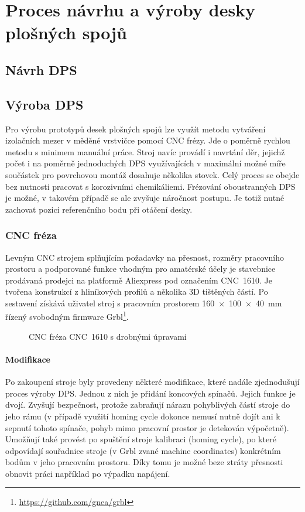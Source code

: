 \section{Proces návrhu a výroby desky plošných spojů}
\subsection{Návrh DPS}


\subsection{Výroba DPS}
Pro výrobu prototypů desek plošných spojů lze využít metodu vytváření
izolačních mezer v měděné vrstvičce pomocí CNC frézy. Jde o poměrně rychlou
metodu s minimem manuální práce. Stroj navíc provádí i navrtání děr, jejichž
počet i na poměrně jednoduchých DPS využívajících v maximální možné míře
součástek pro povrchovou montáž dosahuje několika stovek. Celý proces se obejde
bez nutnosti pracovat s korozivními chemikáliemi. Frézování oboustranných DPS
je možné, v takovém případě se ale zvyšuje náročnost postupu. Je totiž nutné
zachovat pozici referenčního bodu při otáčení desky.

\subsubsection{CNC fréza}
Levným CNC strojem splňujícím požadavky na přesnost, rozměry pracovního
prostoru a podporované funkce vhodným pro amatérské účely je stavebnice
prodávaná prodejci na platformě Aliexpress pod označením CNC~1610. Je tvořena
konstrukcí z hliníkových profilů a několika 3D tištěných částí. Po sestavení
získává uživatel stroj s pracovním prostorem \SI{160 x 100 x 40}{\milli\meter}
řízený svobodným firmware Grbl\footnote{\url{https://github.com/gnea/grbl}}.

\begin{figure}[htbp]
    \centering
    \caption{CNC fréza CNC~1610 s drobnými úpravami}
    \label{fig:CNC freza}
\end{figure}


\paragraph{Modifikace}
Po zakoupení stroje byly provedeny některé modifikace, které nadále
zjednodušují proces výroby DPS. Jednou z nich je přidání koncových spínačů.
Jejich funkce je dvojí. Zvyšují bezpečnost, protože zabraňují nárazu
pohyblivých částí stroje do jeho rámu (v případě využití
\foreignlanguage{english}{homing cycle} dokonce nemusí nutně dojít ani
k sepnutí tohoto spínače, pohyb mimo pracovní prostor je detekován výpočetně).
Umožňují také provést po spuštění stroje kalibraci
(\foreignlanguage{english}{homing cycle}), po které odpovídají souřadnice
stroje (v Grbl zvané \foreignlanguage{english}{machine coordinates})
konkrétním bodům v jeho pracovním prostoru. Díky tomu je možné beze ztráty
přesnosti obnovit práci například po výpadku napájení.

